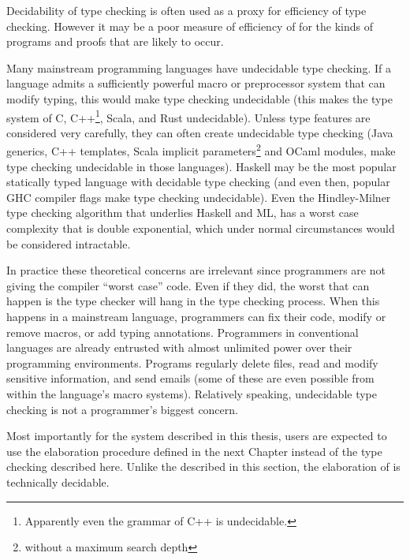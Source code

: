 Decidability of type checking is often used as a proxy for efficiency of type checking.
However it may be a poor measure of efficiency of for the kinds of programs and proofs that are likely to occur.
 
 
Many mainstream programming languages have undecidable type checking.
If a language admits a sufficiently powerful macro or preprocessor system that can modify typing, this would make type checking undecidable (this makes the type system of C, C++\footnote{
  Apparently even the grammar of C++ is undecidable.
}, Scala, and Rust undecidable).
Unless type features are considered very carefully, they can often create undecidable type checking (Java generics, C++ templates, Scala implicit parameters\footnote{
  without a maximum search depth
} and OCaml modules, make type checking undecidable in those languages).
Haskell may be the most popular statically typed language with decidable type checking (and even then, popular GHC compiler flags make type checking undecidable).
Even the Hindley-Milner type checking algorithm that underlies Haskell and ML, has a worst case complexity that is double exponential, which under normal circumstances would be considered intractable.
 
In practice these theoretical concerns are irrelevant since programmers are not giving the compiler ``worst case'' code.
Even if they did, the worst that can happen is the type checker will hang in the type checking process.
When this happens in a mainstream language, programmers can fix their code, modify or remove macros, or add typing annotations.
Programmers in conventional languages are already entrusted with almost unlimited power over their programming environments.
Programs regularly delete files, read and modify sensitive information, and send emails (some of these are even possible from within the language's macro systems).
Relatively speaking, undecidable type checking is not a programmer's biggest concern.
 
Most importantly for the system described in this thesis, users are expected to use the elaboration procedure defined in the next Chapter instead of the \bidir{} type checking described here.
Unlike the \bidir{} described in this section, the elaboration of  is technically decidable.

